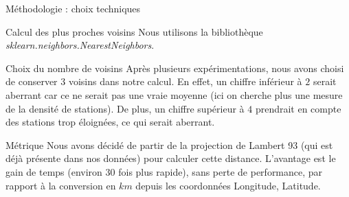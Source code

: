\begin{frame}{Méthodologie : choix techniques}
    \begin{block}{Calcul des plus proches voisins}
        Nous utilisons la bibliothèque \emph{sklearn.neighbors.NearestNeighbors}\footnotemark.
    \end{block}

    \begin{block}{Choix du nombre de voisins}
        Après plusieurs expérimentations, nous avons choisi de conserver $3$ voisins dans notre calcul.
        En effet, un chiffre inférieur à $2$ serait aberrant car ce ne serait pas une vraie moyenne (ici on cherche plus une mesure de la densité de stations).
        De plus, un chiffre supérieur à $4$ prendrait en compte des stations trop éloignées, ce qui serait aberrant.
    \end{block}
    
    \begin{block}{Métrique}
        Nous avons décidé de partir de la projection de Lambert 93 (qui est déjà présente dans nos données) pour calculer cette distance.
        L'avantage est le gain de temps (environ 30 fois plus rapide), sans perte de performance, par rapport à la conversion en $\unit{km}$ depuis les coordonnées Longitude, Latitude.
    \end{block}

\end{frame}

